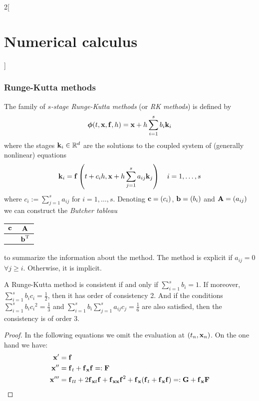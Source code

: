 \documentclass[../../../main_math.tex]{subfiles}
\begin{document}
\begin{multicols}{2}[\section{Numerical calculus}]
  \subsubsection{Runge-Kutta methods}
  \begin{definition}
    The family of \emph{$s$-stage Runge-Kutta methods} (or \emph{RK methods}) is defined by $$\boldsymbol{\mathrm{\phi}}(t,\boldsymbol{\mathrm{x}},\boldsymbol{\mathrm{f}},h)=\boldsymbol{\mathrm{x}}+h\sum_{i=1}^sb_i\boldsymbol{\mathrm{k}}_i$$
    where the stages $\boldsymbol{\mathrm{k}}_i\in\mathbb{R}^d$ are the solutions to the coupled system of (generally nonlinear) equations
    $$\boldsymbol{\mathrm{k}}_i=\boldsymbol{\mathrm{f}}\left(t+c_ih,\boldsymbol{\mathrm{x}}+h\sum_{j=1}^{s}a_{ij}\boldsymbol{\mathrm{k}}_j\right)\quad i=1,\ldots,s$$
    where $c_i:=\sum_{j=1}^{s}a_{ij}$ for $i=1,\ldots,s$. Denoting $\boldsymbol{\mathrm{c}}=(c_i)$, $\boldsymbol{\mathrm{b}}=(b_i)$ and $\boldsymbol{\mathrm{A}}=(a_{ij})$ we can construct the \emph{Butcher tableau}
    \begin{center}
      \renewcommand{\arraystretch}{1.25}
      \begin{tabular}{c|c}
        $\boldsymbol{\mathrm{c}}$ & $\boldsymbol{\mathrm{A}}$             \\
        \hline
                 & ${\boldsymbol{\mathrm{b}}}^{\mathrm{T}}$
      \end{tabular}
    \end{center}
    to summarize the information about the method. The method is explicit if $a_{ij}=0$ $\forall j\geq i$. Otherwise, it is implicit.
  \end{definition}
  \begin{lemma}\label{NC:consistencyRK}
    A Runge-Kutta method is consistent if and only if $\sum_{i=1}^sb_i=1$. If moreover, $\sum_{i=1}^sb_ic_i=\frac{1}{2}$, then it has order of consistency 2. And if the conditions $\sum_{i=1}^sb_i{c_i}^2=\frac{1}{3}$ and $\sum_{i=1}^sb_i\sum_{j=1}^sa_{ij}c_j=\frac{1}{6}$ are also satisfied, then the consistency is of order 3.
  \end{lemma}
  \begin{proof}
    In the following equations we omit the evaluation at $(t_n,\boldsymbol{\mathrm{x}}_n)$.
    On the one hand we have:
    \begin{align*}
      \vf{x}'   & =\vf{f}                                                                                                                                         \\
      \vf{x}''  & =\vf{f}_t+\vf{f}_{\vf{x}}\vf{f}=:\vf{F}                                                                                                         \\
      \vf{x}''' & =\vf{f}_{tt}+2\vf{f}_{\vf{x}t}\vf{f}+{\vf{f}_{\vf{xx}}}\vf{f}^2+\vf{f}_{\vf{x}}(\vf{f}_t+{\vf{f}_{\vf{x}}}\vf{f})=:\vf{G}+\vf{f}_{\vf{x}}\vf{F}

\end{align*}
\end{proof}
\end{multicols}
\end{document}
